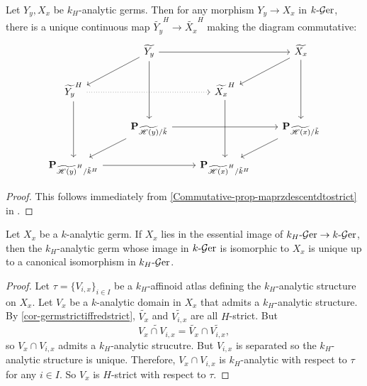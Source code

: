 \begin{proposition}
    Let $Y_y, X_x$ be $k_H$-analytic germs. Then for any morphism $Y_y\rightarrow X_x$ in $k\text{-}\mathcal{G}\mathrm{er}$, there is a unique continuous map $\widetilde{Y_y}^H\rightarrow \widetilde{X_x}^H$ making the diagram commutative:
    \[
        \begin{tikzcd}
            & \widetilde{Y_y} \arrow[rr] \arrow[dd] \arrow[ld]                        &                                                       & \widetilde{X_x} \arrow[dd] \arrow[ld]                        \\
\widetilde{Y_y}^H \arrow[rr, dotted] \arrow[dd]                  &                                                                         & \widetilde{X_x}^H \arrow[dd]                          &                                                              \\
            & \mathbf{P}_{\widetilde{\mathscr{H}(y)}/\tilde{k}} \arrow[rr] \arrow[ld] &                                                       & \mathbf{P}_{\widetilde{\mathscr{H}(x)}/\tilde{k}} \arrow[ld] \\
\mathbf{P}_{\widetilde{\mathscr{H}(y)}^H/\tilde{k}^H} \arrow[rr] &                                                                         & \mathbf{P}_{\widetilde{\mathscr{H}(x)}^H/\tilde{k}^H} &                                                             
\end{tikzcd}  
    \]
\end{proposition}
\begin{proof}
    This follows immediately from \cref{Commutative-prop-maprzdescentdtostrict} in .
\end{proof}

\begin{proposition}
    Let $X_x$ be a $k$-analytic germ. If $X_x$ lies in the essential image of $k_H\text{-}\mathcal{G}\mathrm{er}\rightarrow k\text{-}\mathcal{G}\mathrm{er}$, then the $k_H$-analytic germ whose image in $k\text{-}\mathcal{G}\mathrm{er}$ is isomorphic to $X_x$ is unique up to a canonical isomorphism in $k_H\text{-}\mathcal{G}\mathrm{er}$.
\end{proposition}
\begin{proof}
    Let $\tau=\{V_{i,x}\}_{i\in I}$ be a $k_H$-affinoid atlas defining the $k_H$-analytic structure on $X_x$. Let $V_x$ be a $k$-analytic domain in $X_x$ that admits a $k_H$-analytic structure. By  \cref{cor-germstrictiffredstrict}, $\widetilde{V_x}$ and $\widetilde{V_{i,x}}$ are all $H$-strict. But 
    \[
        \widetilde{V_x\cap V_{i,x}}=  \widetilde{V_x}\cap \widetilde{V_{i,x}},
    \] 
    so $V_x\cap V_{i,x}$ admits a $k_H$-analytic strucutre. But  $V_{i,x}$ is separated so the $k_H$-analytic structure is unique. Therefore, $V_x\cap V_{i,x}$ is $k_H$-analytic with respect to $\tau$ for any $i\in I$. So $V_x$ is $H$-strict with respect to $\tau$. 
\end{proof}



